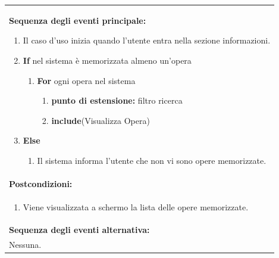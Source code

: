 \documentclass{article}
\begin{document}
\begin{table}[H]
\begin{tabular}{|p{\linewidth}|}
\begin{minipage}{\linewidth}
                        \end{minipage} \\
                        \hline
                        \textbf{Sequenza degli eventi principale:}
                        \begin{enumerate}
                            \item Il caso d'uso inizia quando l'utente entra nella sezione informazioni.
                            \item \textbf{If} nel sistema è memorizzata almeno un'opera
                            \begin{enumerate}
                                \item \textbf{For} ogni opera nel sistema
                                \begin{enumerate}
                                    \item[] \textbf{punto di estensione:} filtro ricerca
                                    \item \textbf{include}(Visualizza Opera)
                                \end{enumerate}
                            \end{enumerate}
                            \item \textbf{Else}
                            \begin{enumerate}
                                \item Il sistema informa l'utente che non vi sono opere memorizzate.
                            \end{enumerate}
                        \end{enumerate} \\
                        \hline
                        \cellcolor{gray!20}
                        \textbf{Postcondizioni:} \\
                        \cellcolor{gray!20}
                        \begin{minipage}{\linewidth}
                            \begin{enumerate}
                                \item Viene visualizzata a schermo la lista delle opere memorizzate.
                            \end{enumerate}
                        \end{minipage} \\
                        \hline
                        \textbf{Sequenza degli eventi alternativa:} \\
                        Nessuna. \\
                        \hline
                    \end{tabular}
                \end{table}
\end{document}
